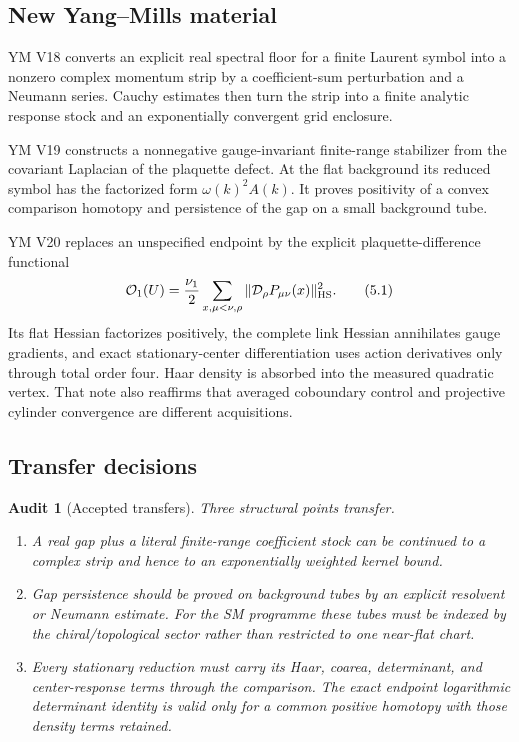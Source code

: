 \documentclass[11pt]{article}
\newtheorem{audit}[theorem]{Audit}
\begin{document}
\subsection{New Yang--Mills material}

YM V18 converts an explicit real spectral floor for a finite Laurent
symbol into a nonzero complex momentum strip by a coefficient-sum
perturbation and a Neumann series.  Cauchy estimates then turn the strip
into a finite analytic response stock and an exponentially convergent
grid enclosure.

YM V19 constructs a nonnegative gauge-invariant finite-range stabilizer
from the covariant Laplacian of the plaquette defect.  At the flat
background its reduced symbol has the factorized form
\(\omega(k)^2A(k)\).  It proves positivity of a convex comparison homotopy
and persistence of the gap on a small background tube.

YM V20 replaces an unspecified endpoint by the explicit
plaquette-difference functional
\[
 \mathcal O_1(U)
 =
 \frac{\nu_1}{2}
 \sum_{x,\mu<\nu,\rho}
 \|\mathcal D_\rho P_{\mu\nu}(x)\|_{\rm HS}^2.
 \tag{5.1}
\]
Its flat Hessian factorizes positively, the complete link Hessian
annihilates gauge gradients, and exact stationary-center differentiation
uses action derivatives only through total order four.  Haar density is
absorbed into the measured quadratic vertex.  That note also reaffirms
that averaged coboundary control and projective cylinder convergence are
different acquisitions.

\subsection{Transfer decisions}

\begin{audit}[Accepted transfers]
\label{audit:v11v5-accepted}
Three structural points transfer.
\begin{enumerate}[label=\textnormal{(\roman*)}]
\item A real gap plus a literal finite-range coefficient stock can be
continued to a complex strip and hence to an exponentially weighted
kernel bound.
\item Gap persistence should be proved on background tubes by an explicit
resolvent or Neumann estimate.  For the SM programme these tubes must be
indexed by the chiral/topological sector rather than restricted to one
near-flat chart.
\item Every stationary reduction must carry its Haar, coarea, determinant,
and center-response terms through the comparison.  The exact endpoint
logarithmic determinant identity is valid only for a common positive
homotopy with those density terms retained.
\end{enumerate}
\end{audit}
\end{document}
